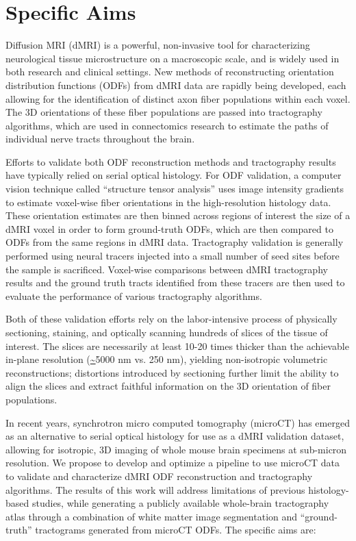 \documentclass[11pt]{article}
\begin{document}
\section*{Specific Aims}
Diffusion MRI (dMRI) is a powerful, non-invasive tool for characterizing
neurological tissue microstructure on a macroscopic scale, and is widely used in
both research and clinical settings. New methods of reconstructing orientation
distribution functions (ODFs) from dMRI data are rapidly being developed, each
allowing for the identification of distinct axon fiber populations within each
voxel. The 3D orientations of these fiber populations are passed into
tractography algorithms, which are used in connectomics research to estimate the
paths of individual nerve tracts throughout the brain.

Efforts to validate both ODF reconstruction methods and tractography results
have typically relied on serial optical histology. For ODF validation, a
computer vision technique called ``structure tensor analysis'' uses image
intensity gradients to estimate voxel-wise fiber orientations in the
high-resolution histology data. These orientation estimates are then binned
across regions of interest the size of a dMRI voxel in order to form
ground-truth ODFs, which are then compared to ODFs from the same regions in dMRI
data.  Tractography validation is generally performed using neural tracers
injected into a small number of seed sites before the sample is
sacrificed. Voxel-wise comparisons between dMRI tractography results and the
ground truth tracts identified from these tracers are then used to evaluate the
performance of various tractography algorithms.

Both of these validation efforts rely on the labor-intensive process of
physically sectioning, staining, and optically scanning hundreds of slices of
the tissue of interest. The slices are necessarily at least 10-20 times thicker
than the achievable in-plane resolution (\url{~}5000 nm vs. 250 nm), yielding
non-isotropic volumetric reconstructions; distortions introduced by sectioning
further limit the ability to align the slices and extract faithful information
on the 3D orientation of fiber populations.

In recent years, synchrotron micro computed tomography (microCT) has emerged as
an alternative to serial optical histology for use as a dMRI validation dataset, allowing
for isotropic, 3D imaging of whole mouse brain specimens at sub-micron
resolution. We propose to develop and optimize a pipeline to use microCT data to validate
and characterize dMRI ODF reconstruction and tractography algorithms. The
results of this work will address limitations of previous histology-based
studies, while generating a publicly available whole-brain tractography atlas
through a combination of white matter image segmentation and ``ground-truth''
tractograms generated from microCT ODFs. The specific aims are:
\end{document}

